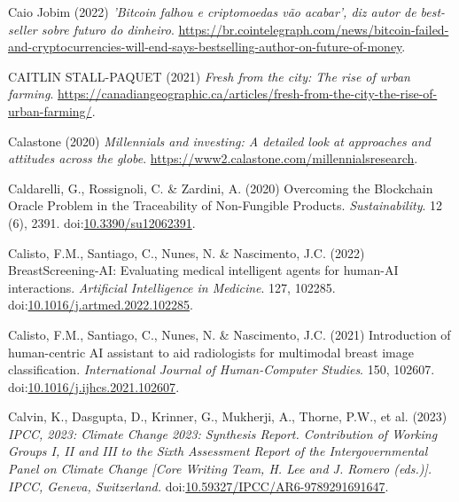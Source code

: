 \documentclass[
  letterpaper,
  DIV=11,
  numbers=noendperiod]{scrartcl}
\newlength{\cslhangindent}
\newenvironment{CSLReferences}[2] %
 {\begin{list}{}{%
  \setlength{\itemindent}{0pt}
  \setlength{\leftmargin}{0pt}
  \setlength{\parsep}{0pt}
  \ifodd #1
   \setlength{\leftmargin}{\cslhangindent}
   \setlength{\itemindent}{-1\cslhangindent}
  \fi
  \setlength{\itemsep}{#2\baselineskip}}}
 {\end{list}}
\begin{document}
\begin{CSLReferences}{0}{1}
Caio Jobim (2022) \emph{'{Bitcoin} falhou e criptomoedas v{ã}o acabar',
diz autor de best-seller sobre futuro do dinheiro}.
\url{https://br.cointelegraph.com/news/bitcoin-failed-and-cryptocurrencies-will-end-says-bestselling-author-on-future-of-money}.

CAITLIN STALL-PAQUET (2021) \emph{Fresh from the city: {The} rise of
urban farming}.
\url{https://canadiangeographic.ca/articles/fresh-from-the-city-the-rise-of-urban-farming/}.

Calastone (2020) \emph{Millennials and investing: A detailed look at
approaches and attitudes across the globe}.
\url{https://www2.calastone.com/millennialsresearch}.

Caldarelli, G., Rossignoli, C. \& Zardini, A. (2020) Overcoming the
{Blockchain Oracle Problem} in the {Traceability} of {Non-Fungible
Products}. \emph{Sustainability}. 12 (6), 2391.
doi:\href{https://doi.org/10.3390/su12062391}{10.3390/su12062391}.

Calisto, F.M., Santiago, C., Nunes, N. \& Nascimento, J.C. (2022)
{BreastScreening-AI}: {Evaluating} medical intelligent agents for
human-{AI} interactions. \emph{Artificial Intelligence in Medicine}.
127, 102285.
doi:\href{https://doi.org/10.1016/j.artmed.2022.102285}{10.1016/j.artmed.2022.102285}.

Calisto, F.M., Santiago, C., Nunes, N. \& Nascimento, J.C. (2021)
Introduction of human-centric {AI} assistant to aid radiologists for
multimodal breast image classification. \emph{International Journal of
Human-Computer Studies}. 150, 102607.
doi:\href{https://doi.org/10.1016/j.ijhcs.2021.102607}{10.1016/j.ijhcs.2021.102607}.

Calvin, K., Dasgupta, D., Krinner, G., Mukherji, A., Thorne, P.W., et
al. (2023) \emph{{IPCC}, 2023: {Climate Change} 2023: {Synthesis
Report}. {Contribution} of {Working Groups I}, {II} and {III} to the
{Sixth Assessment Report} of the {Intergovernmental Panel} on {Climate
Change} {[}{Core Writing Team}, {H}. {Lee} and {J}. {Romero} (eds.){]}.
{IPCC}, {Geneva}, {Switzerland}.}
doi:\href{https://doi.org/10.59327/IPCC/AR6-9789291691647}{10.59327/IPCC/AR6-9789291691647}.


\end{CSLReferences}
\end{document}
